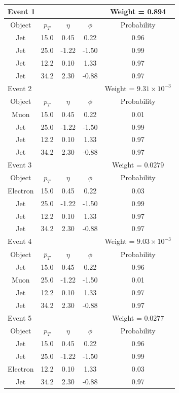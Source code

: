 \documentclass{cmspaper}
\begin{document}
\begin{tabular}{|c|c|c|c|c|}\hline 
\multicolumn{4}{|l|}{Event 1} & Weight = 0.894\\
\hline
Object & $p_T$ & $\eta$ & $\phi$ & Probability \\ 
 \hline 
Jet & 15.0 & 0.45 & 0.22 & 0.96 \\
Jet & 25.0 & -1.22 & -1.50 & 0.99 \\
Jet & 12.2 & 0.10 & 1.33 & 0.97 \\
Jet & 34.2 & 2.30 & -0.88 & 0.97 \\
 \hline 
 \hline 

\multicolumn{4}{|l|}{Event 2} & Weight = $9.31 \times 10^{-3}$ \\
\hline
Object & $p_T$ & $\eta$ & $\phi$ & Probability \\ 
 \hline 
Muon & 15.0 & 0.45 & 0.22 & 0.01 \\
Jet & 25.0 & -1.22 & -1.50 & 0.99 \\
Jet & 12.2 & 0.10 & 1.33 & 0.97 \\
Jet & 34.2 & 2.30 & -0.88 & 0.97 \\
 \hline 
 \hline 

\multicolumn{4}{|l|}{Event 3} & Weight = $ 0.0279$ \\
\hline
Object & $p_T$ & $\eta$ & $\phi$ & Probability \\ 
 \hline 
Electron & 15.0 & 0.45 & 0.22 & 0.03 \\
Jet & 25.0 & -1.22 & -1.50 & 0.99 \\
Jet & 12.2 & 0.10 & 1.33 & 0.97 \\
Jet & 34.2 & 2.30 & -0.88 & 0.97 \\
 \hline 
 \hline 

\multicolumn{4}{|l|}{Event 4} & Weight = $9.03 \times 10^{-3}$ \\
\hline
Object & $p_T$ & $\eta$ & $\phi$ & Probability \\ 
 \hline 
Jet  & 15.0 & 0.45 & 0.22 & 0.96 \\
Muon & 25.0 & -1.22 & -1.50 & 0.01 \\
Jet  & 12.2 & 0.10 & 1.33 & 0.97 \\
Jet  & 34.2 & 2.30 & -0.88 & 0.97 \\
 \hline 
 \hline 


\multicolumn{4}{|l|}{Event 5} & Weight = $ 0.0277$ \\
\hline
Object & $p_T$ & $\eta$ & $\phi$ & Probability \\ 
 \hline 
Jet & 15.0 & 0.45 & 0.22 & 0.96 \\
Jet & 25.0 & -1.22 & -1.50 & 0.99 \\
Electron & 12.2 & 0.10 & 1.33 & 0.03 \\
Jet & 34.2 & 2.30 & -0.88 & 0.97 \\
 \hline 
 \hline 


\end{tabular}
\end{document}

